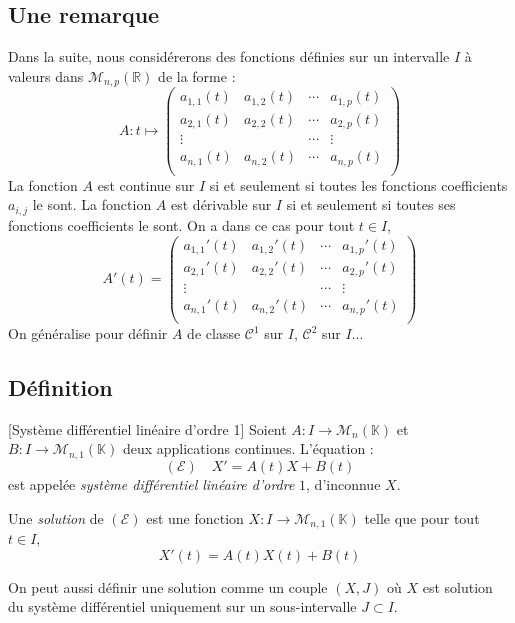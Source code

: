 \documentclass[french,11pt,twoside]{VcCours}
\begin{document}
\subsection{Une remarque}
Dans la suite, nous considérerons des fonctions définies sur un intervalle $I$ à valeurs dans $\mathcal{M}_{n,p}(\mathbb{R})$ de la forme :
$$ A : t \mapsto \begin{pmatrix}
a_{1,1}(t) & a_{1,2}(t) & \cdots & a_{1,p}(t)  \\
a_{2,1}(t) & a_{2,2}(t) & \cdots & a_{2,p}(t)  \\
\vdots & & \cdots & \vdots \\
a_{n,1}(t) & a_{n,2}(t) & \cdots & a_{n,p}(t)  \\
\end{pmatrix}$$
La fonction $A$ est continue sur $I$ si et seulement si toutes les fonctions coefficients $a_{i,j}$ le sont. La fonction $A$ est dérivable sur $I$ si et seulement si toutes ses fonctions coefficients le sont. On a dans ce cas pour tout $t \in I$,
$$ A'(t) = \begin{pmatrix}
a_{1,1}'(t) & a_{1,2}'(t) & \cdots & a_{1,p}'(t)  \\
a_{2,1}'(t) & a_{2,2}'(t) & \cdots & a_{2,p}'(t)  \\
\vdots & & \cdots & \vdots \\
a_{n,1}'(t) & a_{n,2}'(t) & \cdots & a_{n,p}'(t)  \\
\end{pmatrix}$$
On généralise pour définir $A$ de classe $\mathcal{C}^1$ sur $I$, $\mathcal{C}^2$ sur $I$...

\subsection{Définition}

\begin{Definition}{}[Système différentiel linéaire d'ordre 1] Soient $A : I \rightarrow \mathcal{M}_n(\mathbb{K})$ et $B : I \rightarrow \mathcal{M}_{n,1}(\mathbb{K})$ deux applications continues. L'équation :
$$ (\mathcal{E}) \quad X'=A(t)X+B(t)$$
est appelée \emph{système différentiel linéaire d'ordre} $1$, d'inconnue $X$.

Une \emph{solution} de $(\mathcal{E})$ est une fonction $X : I \rightarrow \mathcal{M}_{n,1}(\mathbb{K})$ telle que pour tout $t \in I$,
$$ X'(t) = A(t) X(t) + B(t)$$
\end{Definition}

\begin{Remarque}{}
On peut aussi définir une solution comme un couple $(X,J)$ où $X$ est solution du système différentiel uniquement sur un sous-intervalle $J \subset I$.
\end{Remarque}
\end{document}
